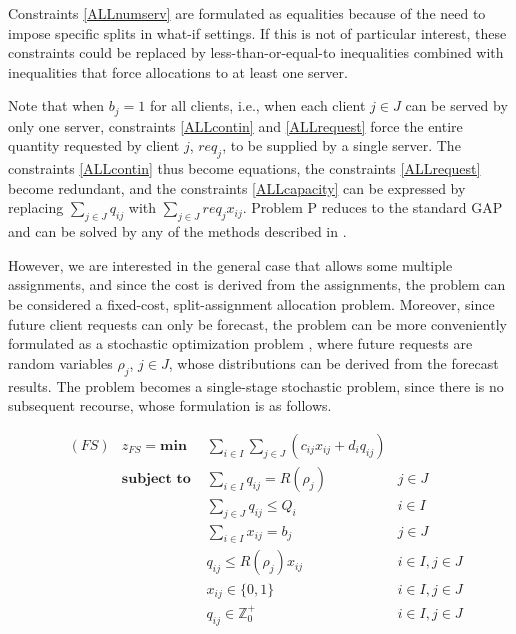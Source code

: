 \documentclass[opre,sglanonrev,11pt]{informs4}
\begin{document}
Constraints \ref{ALLnumserv} are formulated as equalities because of the need to impose specific splits in what-if settings. If this is not of particular interest, these constraints could be replaced by less-than-or-equal-to inequalities combined with inequalities that force allocations to at least one server.

Note that when $b_j = 1$ for all clients, i.e., when each client $j \in J$ can be served by only one server, constraints \ref{ALLcontin} and \ref{ALLrequest} force the entire quantity requested by client $j$, $req_j$, to be supplied by a single server. The constraints \ref{ALLcontin} thus become equations, the constraints \ref{ALLrequest} become redundant, and the constraints \ref{ALLcapacity} can be expressed by replacing $\sum_{j \in J}q_{ij}$ with $\sum_{j \in J}req_j x_{ij}$. Problem P reduces to the standard GAP and can be solved by any of the methods described in \citet{matheuristics}.

However, we are interested in the general case that allows some multiple assignments, and since the cost is derived from the assignments, the problem can be considered a fixed-cost, split-assignment allocation problem.
Moreover, since future client requests can only be forecast, the problem can be more conveniently formulated as a stochastic optimization problem \citep{KM10,BL11}, where future requests are random variables $\rho_j$, $j \in J$, whose distributions can be derived from the forecast results. The problem becomes a single-stage stochastic problem, since there is no subsequent recourse, whose formulation is as follows.

\begin{align}
	&(FS) & z_{FS} = \textbf{min } & \sum_{i \in I} \sum_{j \in J} ( c_{ij}x_{ij} + d_i q_{ij} ) \label{SALLobj}\\
	& &  \textbf{subject to }
	& \sum_{i \in I} q_{ij} = R(\rho_j) & j \in J  \label{SALLrequest}\\
	& &  & \sum_{j \in J}q_{ij} \leq Q_i & i \in I \label{SALLcapacity}\\
	& &  & \sum_{i \in I} x_{ij} = b_j & j \in J  \label{SALLnumserv}\\
	& &  & q_{ij} \leq R(\rho_j) x_{ij} & i \in I, j \in J \label{SALLcontin}\\
	& &  & x_{ij} \in \{0,1\} & i\in I, j \in J \label{SALLx}\\
	& &  & q_{ij} \in \mathbb{Z}^+_0 & i\in I, j \in J \label{SALLq}
\end{align}
\end{document}
